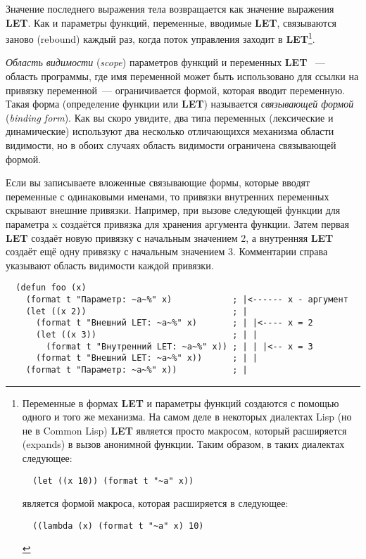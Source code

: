 Значение последнего выражения тела возвращается как значение выражения \textbf{LET}. Как и
параметры функций, переменные, вводимые \textbf{LET}, связываются заново (rebound) каждый
раз, когда поток управления заходит в \textbf{LET}\footnote{Переменные в формах \textbf{LET} и
параметры функций создаются с помощью одного и того же механизма. На самом деле в
некоторых диалектах Lisp (но не в Common Lisp) \textbf{LET} является просто макросом,
который расширяется (expands) в вызов анонимной функции. Таким образом, в таких диалектах
следующее:

\begin{lstlisting}
  (let ((x 10)) (format t "~a" x))
\end{lstlisting}


является формой макроса, которая расширяется в следующее:

\begin{lstlisting}
  ((lambda (x) (format t "~a" x) 10)
\end{lstlisting}
}.

\textit{Область видимости} (\textit{scope}) параметров функций и переменных \textbf{LET}
~--- область программы, где имя переменной может быть использовано для ссылки на привязку
переменной~--- ограничивается формой, которая вводит переменную. Такая форма (определение
функции или \textbf{LET}) называется \textit{связывающей формой} (\textit{binding
  form}). Как вы скоро увидите, два типа переменных (лексические и динамические)
используют два несколько отличающихся механизма области видимости, но в обоих случаях
область видимости ограничена связывающей формой.

Если вы записываете вложенные связывающие формы, которые вводят переменные с одинаковыми
именами, то привязки внутренних переменных скрывают внешние привязки. Например, при вызове
следующей функции для параметра x создаётся привязка для хранения аргумента функции. Затем
первая \textbf{LET} создаёт новую привязку с начальным значением 2, а внутренняя
\textbf{LET} создаёт ещё одну привязку с начальным значением 3. Комментарии справа
указывают область видимости каждой привязки.

\begin{lstlisting}
  (defun foo (x)
    (format t "Параметр: ~a~%" x)            ; |<------ x - аргумент
    (let ((x 2))                             ; |
      (format t "Внешний LET: ~a~%" x)       ; | |<---- x = 2
      (let ((x 3))                           ; | |
        (format t "Внутренний LET: ~a~%" x)) ; | | |<-- x = 3
      (format t "Внешний LET: ~a~%" x))      ; | |
    (format t "Параметр: ~a~%" x))           ; |
\end{lstlisting}

